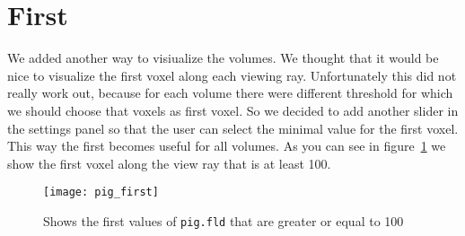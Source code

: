\section{First}\label{Sec:First}
We added another way to visiualize the volumes.
We thought that it would be nice to visualize the first voxel along each viewing ray.
Unfortunately this did not really work out,
because for each volume there were different threshold for which we should choose that voxels as first voxel.
 So we decided to add another slider in the settings panel so that the user can select the minimal value for the first voxel.
 This way the first becomes useful for all volumes.
As you can see in figure~\ref{fig:first} we show the first voxel along the view ray that is at least 100.
\begin{figure}[H]
	\centering
		\texttt{[image: pig\_first]}
		\caption{Shows the first values of \texttt{pig.fld} that are greater or equal to 100}
	\label{fig:first}
\end{figure}